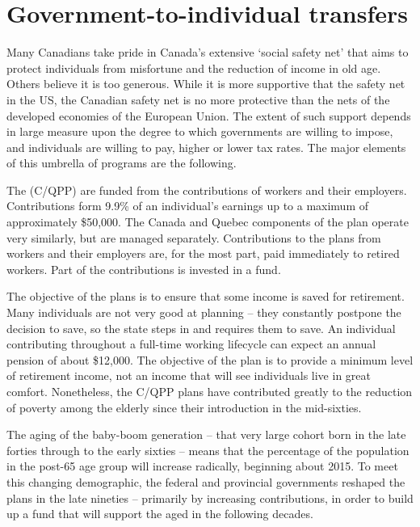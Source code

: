 \section{Government-to-individual transfers} \label{sec:transfers}

Many Canadians take pride in Canada's extensive `social safety net' that aims to protect individuals from misfortune and the reduction of income in old age. Others believe it is too generous. While it is more supportive that the safety net in the US, the Canadian safety net is no more protective than the nets of the developed economies of the European Union. The extent of such support depends in large measure upon the degree to which governments are willing to impose, and individuals are willing to pay, higher or lower tax rates. The major elements of this umbrella of programs are the following.

The  (C/QPP) are funded from the contributions of workers and their employers. Contributions form 9.9\% of an individual's earnings up to a maximum of approximately \$50,000. The Canada and Quebec components of the plan operate very similarly, but are managed separately. Contributions to the plans from workers and their employers are, for the most part, paid immediately to retired workers. Part of the contributions is invested in a fund.

The objective of the plans is to ensure that some income is saved for retirement. Many individuals are not very good at planning -- they constantly postpone the decision to save, so the state steps in and requires them to save. An individual contributing throughout a full-time working lifecycle can expect an annual pension of about \$12,000. The objective of the plan is to provide a minimum level of retirement income, not an income that will see individuals live in great comfort. Nonetheless, the C/QPP plans have contributed greatly to the reduction of poverty among the elderly since their introduction in the mid-sixties.

The aging of the baby-boom generation -- that very large cohort born in the late forties through to the early sixties -- means that the percentage of the population in the post-65 age group will increase radically, beginning about 2015. To meet this changing demographic, the federal and provincial governments reshaped the plans in the late nineties -- primarily by increasing contributions, in order to build up a fund that will support the aged in the following decades.

